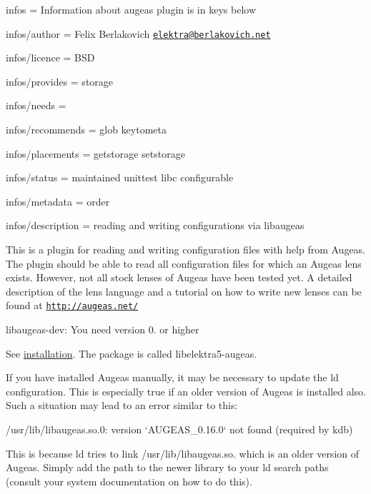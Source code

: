 
\begin{DoxyItemize}
\item infos = Information about augeas plugin is in keys below
\item infos/author = Felix Berlakovich \href{mailto:elektra@berlakovich.net}{\tt elektra@berlakovich.\+net}
\item infos/licence = B\+SD
\item infos/provides = storage
\item infos/needs =
\item infos/recommends = glob keytometa
\item infos/placements = getstorage setstorage
\item infos/status = maintained unittest libc configurable
\item infos/metadata = order
\item infos/description = reading and writing configurations via libaugeas
\end{DoxyItemize}

This is a plugin for reading and writing configuration files with help from Augeas. The plugin should be able to read all configuration files for which an Augeas lens exists. However, not all stock lenses of Augeas have been tested yet. A detailed description of the lens language and a tutorial on how to write new lenses can be found at \href{http://augeas.net/}{\tt http\+://augeas.\+net/}


\begin{DoxyItemize}
\item {\ttfamily libaugeas-\/dev}\+: You need version 0. or higher
\end{DoxyItemize}

See \hyperlink{doc_INSTALL_md}{installation}. The package is called {\ttfamily libelektra5-\/augeas}.

If you have installed Augeas manually, it may be necessary to update the ld configuration. This is especially true if an older version of Augeas is installed also. Such a situation may lead to an error similar to this\+:


\begin{DoxyCode}
/usr/lib/libaugeas.so.0: version `AUGEAS\_0.16.0` not found (required by kdb)
\end{DoxyCode}


This is because {\ttfamily ld} tries to link {\ttfamily /usr/lib/libaugeas.so.} which is an older version of Augeas. Simply add the path to the newer library to your ld search paths (consult your system documentation on how to do this).

